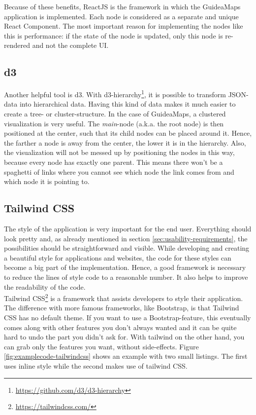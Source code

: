 Because of these benefits, ReactJS is the framework in which the GuideaMaps application is implemented. Each node is considered as a separate and unique React Component. The most important reason for implementing the nodes like this is performance: if the state of the node is updated, only this node is re-rendered and not the complete UI.

\subsection{d3}\label{sec:d3}
Another helpful tool is d3. With d3-hierarchy\footnote{\url{https://github.com/d3/d3-hierarchy}}, it is possible to transform JSON-data into hierarchical data. Having this kind of data makes it much easier to create a tree- or cluster-structure. In the case of GuideaMaps, a clustered visualization is very useful. The \textit{main}-node (a.k.a. the root node) is then positioned at the center, such that its child nodes can be placed around it. Hence, the farther a node is away from the center, the lower it is in the hierarchy. Also, the visualization will not be messed up by positioning the nodes in this way, because every node has exactly one parent. This means there won't be a spaghetti of links where you cannot see which node the link comes from and which node it is pointing to.

\subsection{Tailwind CSS}\label{sec:tailwind}
The style of the application is very important for the end user. Everything should look pretty and, as already mentioned in section \ref{sec:usability-requirements}, the possibilities should be straightforward and visible. While developing and creating a beautiful style for applications and websites, the code for these styles can become a big part of the implementation. Hence, a good framework is necessary to reduce the lines of style code to a reasonable number. It also helps to improve the readability of the code.\\

Tailwind CSS\footnote{\url{https://tailwindcss.com/}} is a framework that assists developers to style their application. The difference with more famous frameworks, like Bootstrap, is that Tailwind CSS has no default theme. If you want to use a Bootstrap-feature, this eventually comes along with other features you don't always wanted and it can be quite hard to undo the part you didn't ask for. With tailwind on the other hand, you can grab only the features you want, without side-effects. Figure \ref{fig:examplecode-tailwindcss} shows an example with two small listings. The first uses inline style while the second makes use of tailwind CSS.\\

